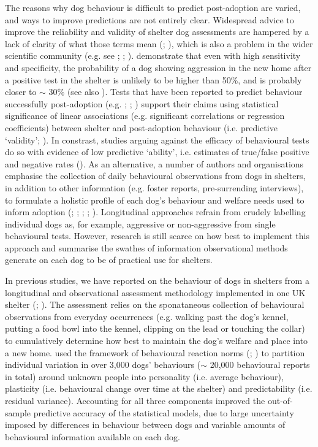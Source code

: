 \documentclass[12pt]{article}
\begin{document}
The reasons why dog behaviour is difficult to predict post-adoption are varied, and ways to improve predictions are not entirely clear. Widespread advice to improve the reliability and validity of shelter dog assessments are hampered by a lack of clarity of what those terms mean (\cite{patronek2019}; \cite{rayment2015}), which is also a problem in the wider scientific community (e.g. see \cite{borsboom2004}; \cite{borsboom2009}; \cite{maul2016}). \textcite{patbrad2016} demonstrate that even with high sensitivity and specificity, the probability of a dog showing aggression in the new home after a positive test in the shelter is unlikely to be higher than 50\%, and is probably closer to $\sim$ 30\% (see also \cite{patronek2019}). Tests that have been reported to predict behaviour successfully post-adoption (e.g. \cite{valsecchi2011}; \cite{poulsen2010}; \cite{bollen2008}) support their claims using statistical significance of linear associations (e.g. significant correlations or regression coefficients) between shelter and post-adoption behaviour (i.e. predictive `validity'; \cite{patronek2019}). In constrast, studies arguing against the efficacy of behavioural tests do so with evidence of low predictive `ability', i.e. estimates of true/false positive and negative rates (\cite{patronek2019}). As an alternative, a number of authors and organisations emphasise the collection of daily behavioural observations from dogs in shelters, in addition to other information (e.g. foster reports, pre-surrending interviews), to formulate a holistic profile of each dog's behaviour and welfare needs used to inform adoption (\cite{patronek2019}; \cite{ASPCA2018}; \cite{rayment2015}; \cite{mornement2015}; \cite{clay2020}). Longitudinal approaches refrain from crudely labelling individual dogs as, for example, aggressive or non-aggressive from single behavioural tests. However, research is still scarce on how best to implement this approach and summarise the swathes of information observational methods generate on each dog to be of practical use for shelters.

In previous studies, we have reported on the behaviour of dogs in shelters from a longitudinal and observational assessment methodology implemented in one UK shelter (\cite{goold2017aggressiveness}; \cite{goold2017modelling}). The assessment relies on the sponataneous collection of behavioural observations from everyday occurrences (e.g. walking past the dog's kennel, putting a food bowl into the kennel, clipping on the lead or touching the collar) to cumulatively determine how best to maintain the dog's welfare and place into a new home. \textcite{goold2017modelling} used the framework of behavioural reaction norms (\cite{dingemanse2010}; \cite{cleasby2015}) to partition individual variation in over 3,000 dogs' behaviours ($\sim$ 20,000 behavioural reports in total) around unknown people into personality (i.e. average behaviour), plasticity (i.e. behavioural change over time at the shelter) and predictability (i.e. residual variance). Accounting for all three components improved the out-of-sample predictive accuracy of the statistical models, due to large uncertainty imposed by differences in behaviour between dogs and variable amounts of behavioural information available on each dog.
\end{document}
